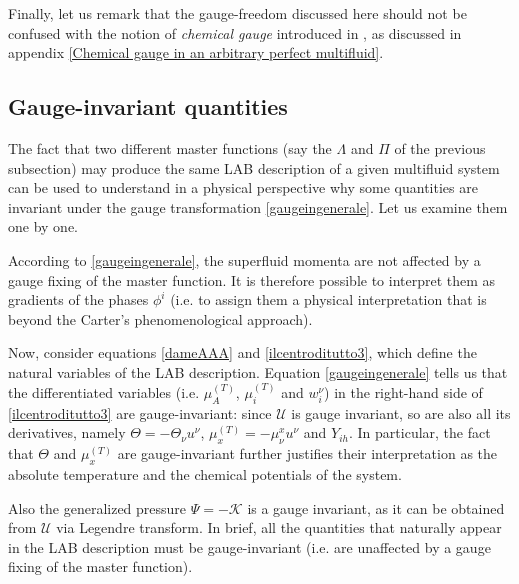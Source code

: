 \documentclass[usenatbib]{mnras}
\begin{document}
Finally, let us remark that the gauge-freedom discussed here should not be confused with the notion of \emph{chemical gauge} introduced in \cite{carter_macro_2006}, as discussed in appendix \ref{Chemical gauge in an arbitrary perfect multifluid}.


\subsection{Gauge-invariant quantities}
\label{Thermodynamic origin of the redundancy}


The fact that two different master functions (say the $\Lambda$ and $\Pi$ of the previous subsection) may produce the same LAB description of a given multifluid system can be used to understand in a physical perspective why some quantities are invariant under the gauge transformation \eqref{gaugeingenerale}. Let us examine them one by one.

According to \eqref{gaugeingenerale}, the superfluid momenta are not affected by a gauge fixing of the master function. It is therefore possible to interpret them as gradients of the  phases $\phi^i$ 
(i.e. to assign them a physical interpretation that is beyond the Carter's phenomenological approach).


Now, consider equations  \eqref{dameAAA} and \eqref{ilcentroditutto3}, which define the natural variables of the LAB description. Equation  \eqref{gaugeingenerale} tells us that the differentiated variables (i.e. $\mu_A^{(T)}$, $\mu_i^{(T)}$ and $w_i^{\nu}$) in the right-hand side of \eqref{ilcentroditutto3} are gauge-invariant: 
since $\mathcal{U}$ is gauge invariant, so are also all its derivatives, namely $\Theta=-\Theta_\nu u^\nu$, $\mu_x^{(T)}=-\mu^x_\nu u^\nu$ and $Y_{ih}$. In particular, the fact that $\Theta$ and $\mu_x^{(T)}$ are gauge-invariant further justifies their interpretation as the absolute temperature and the chemical potentials of the system.

Also the generalized pressure $\Psi = -\mathcal{K}$ is a gauge invariant, as it can be obtained from $\mathcal{U}$ via Legendre transform.
In brief, all the quantities that naturally appear in the LAB description must be gauge-invariant (i.e. are unaffected by a gauge fixing of the master function). 
\end{document}
